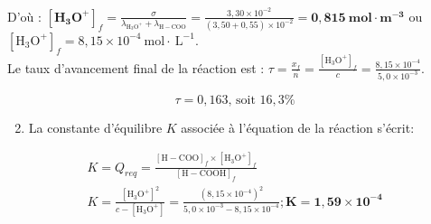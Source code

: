 D'où : $\left[\mathbf{H}_{\mathbf{3}} \mathbf{O}^{+}\right]_{f}=\frac{\sigma}{\lambda_{\mathrm{H}_{3} \mathrm{O}^{+}}+\lambda_{\mathrm{H}-\mathrm{COO}}}=\frac{3,30 \times 10^{-2}}{(3,50+0,55) \times 10^{-2}}=\mathbf{0 , 8 1 5 ~ m o l} \cdot \mathbf{m}^{-\mathbf{3}}$ ou $\left[\mathrm{H}_{3} \mathrm{O}^{+}\right]_{f}=8,15 \times 10^{-4} \mathrm{~mol} \cdot \mathrm{~L}^{-1}$.\\
Le taux d'avancement final de la réaction est : $\tau=\frac{x_{f}}{n}=\frac{\left[\mathrm{H}_{3} \mathrm{O}^{+}\right]_{f}}{c}=\frac{8,15 \times 10^{-4}}{5,0 \times 10^{-3}}$.

$$
\tau=0,163 \text {, soit } 16,3 \%
$$

\begin{enumerate}
  \setcounter{enumi}{1}
  \item La constante d'équilibre $K$ associée à l'équation de la réaction s'écrit:
\end{enumerate}

$$
\begin{array}{r}
K=Q_{r e q}=\frac{[\mathrm{H}-\mathrm{COO}]_{f} \times\left[\mathrm{H}_{3} \mathrm{O}^{+}\right]_{f}}{[\mathrm{H}-\mathrm{COOH}]_{f}} \\
K=\frac{\left[\mathrm{H}_{3} \mathrm{O}^{+}\right]^{2}}{c-\left[\mathrm{H}_{3} \mathrm{O}^{+}\right]}=\frac{\left(8,15 \times 10^{-4}\right)^{2}}{5,0 \times 10^{-3}-8,15 \times 10^{-4}} ; \boldsymbol{K = 1 , 5 9 \times 1 0 ^ { - 4 }}
\end{array}
$$

